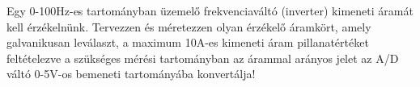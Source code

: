 \begin{example}

Egy 0-100Hz-es tartományban üzemelő frekvenciaváltó (inverter) kimeneti áramát kell érzékelnünk. Tervezzen és méretezzen olyan érzékelő áramkört, amely galvanikusan leválaszt, a maximum 10A-es kimeneti áram pillanatértéket feltételezve a szükséges mérési tartományban az árammal arányos jelet az A/D váltó 0-5V-os bemeneti tartományába konvertálja!

\tcbline
\vspace{1mm}

\solution

\end{example}